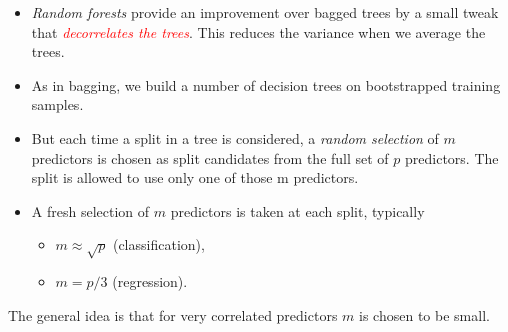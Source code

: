 \documentclass[10pt,ignorenonframetext,]{beamer}
\providecommand{\tightlist}{%
  \setlength{\itemsep}{0pt}\setlength{\parskip}{0pt}}
\begin{document}
\begin{frame}

\begin{itemize}
\item
  \emph{Random forests} provide an improvement over bagged trees by a
  small tweak that \emph{\textcolor{red}{decorrelates the trees}}. This
  reduces the variance when we average the trees.
\item
  As in bagging, we build a number of decision trees on bootstrapped
  training samples.
\item
  But each time a split in a tree is considered, a \emph{random
  selection} of \(m\) predictors is chosen as split candidates from the
  full set of \(p\) predictors. The split is allowed to use only one of
  those m predictors.
\item
  A fresh selection of \(m\) predictors is taken at each split,
  typically

  \begin{itemize}
  \tightlist
  \item
    \(m\approx \sqrt p\) (classification),\\
  \item
    \(m=p/3\) (regression).
  \end{itemize}
\end{itemize}

\vspace{2mm}

The general idea is that for very correlated predictors \(m\) is chosen
to be small.

\end{frame}
\end{document}
